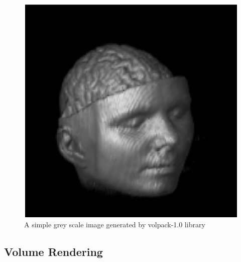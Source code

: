 \documentclass[a4paper,12pt]{article}
\begin{document}
\begin{figure}  
\begin{center}  
  \includegraphics{brainsmall1.eps}
\caption{A simple grey scale image generated by volpack-1.0 library}
\label{smb}
\end{center}
\end{figure}

 

%
%
%  

\subsection{Volume Rendering}
\end{document}
